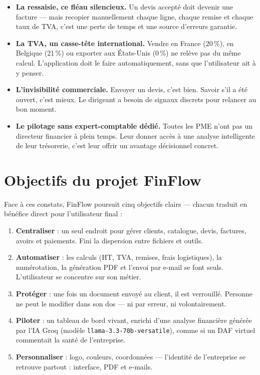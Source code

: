 \documentclass[12pt,a4paper]{report}
\begin{document}
\begin{itemize}[leftmargin=*]
    \item \textbf{La ressaisie, ce fléau silencieux.} Un devis accepté doit devenir une facture --- mais recopier manuellement chaque ligne, chaque remise et chaque taux de TVA, c'est une perte de temps et une source d'erreurs garantie.
    \item \textbf{La TVA, un casse-tête international.} Vendre en France (20\,\%), en Belgique (21\,\%) ou exporter aux États-Unis (0\,\%) ne relève pas du même calcul. L'application doit le faire automatiquement, sans que l'utilisateur ait à y penser.
    \item \textbf{L'invisibilité commerciale.} Envoyer un devis, c'est bien. Savoir s'il a été ouvert, c'est mieux. Le dirigeant a besoin de signaux discrets pour relancer au bon moment.
    \item \textbf{Le pilotage sans expert-comptable dédié.} Toutes les PME n'ont pas un directeur financier à plein temps. Leur donner accès à une analyse intelligente de leur trésorerie, c'est leur offrir un avantage décisionnel concret.
\end{itemize}

\section{Objectifs du projet FinFlow}

Face à ces constats, FinFlow poursuit cinq objectifs clairs --- chacun traduit en bénéfice direct pour l'utilisateur final :

\begin{enumerate}[leftmargin=*]
    \item \textbf{Centraliser} : un seul endroit pour gérer clients, catalogue, devis, factures, avoirs et paiements. Fini la dispersion entre fichiers et outils.
    \item \textbf{Automatiser} : les calculs (HT, TVA, remises, frais logistiques), la numérotation, la génération PDF et l'envoi par e-mail se font seuls. L'utilisateur se concentre sur son métier.
    \item \textbf{Protéger} : une fois un document envoyé au client, il est verrouillé. Personne ne peut le modifier dans son dos --- ni par erreur, ni volontairement.
    \item \textbf{Piloter} : un tableau de bord vivant, enrichi d'une analyse financière générée par l'IA Groq (modèle \texttt{llama-3.3-70b-versatile}), comme si un DAF virtuel commentait la santé de l'entreprise.
    \item \textbf{Personnaliser} : logo, couleurs, coordonnées --- l'identité de l'entreprise se retrouve partout : interface, PDF et e-mails.
\end{enumerate}
\end{document}

